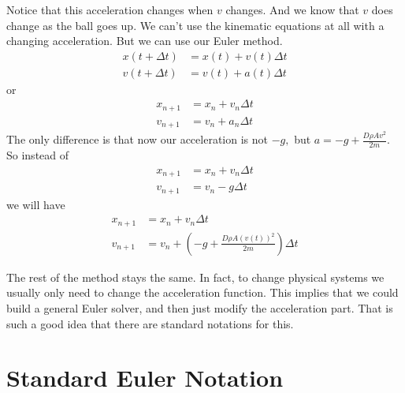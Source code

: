\documentclass[twoside,11pt,ShortChapTitles]{BYUTextbook}
\begin{document}
Notice that this acceleration changes when $v$ changes. And we know that $v$
does change as the ball goes up. We can't use the kinematic equations at all
with a changing acceleration. But we can use our Euler method. \begin{align*}
x(t+\Delta t)  & =x(t)+v(t)\Delta t\\
v(t+\Delta t)  & =v(t)+a\left(  t\right)  \Delta t
\end{align*}
or \begin{align*}
x_{n+1}  & =x_{n}+v_{n}\Delta t\\
v_{n+1}  & =v_{n}+a_{n}\Delta t
\end{align*}
The only difference is that now our acceleration is not $-g,$ but
$a=-g+\frac{D\rho Av^{2}}{2m}.$ So instead of
\begin{align*}
x_{n+1}  & =x_{n}+v_{n}\Delta t\\
v_{n+1}  & =v_{n}-g\Delta t
\end{align*}
we will have \begin{align*}
x_{n+1}  & =x_{n}+v_{n}\Delta t\\
v_{n+1}  & =v_{n}+\left(  -g+\frac{D\rho A\left(  v(t)\right)  ^{2}} {2m}\right)  \Delta t
\end{align*}


The rest of the method stays the same. In fact, to change physical systems we
usually only need to change the acceleration function. This implies that we
could build a general Euler solver, and then just modify the acceleration
part. That is such a good idea that there are standard notations for this.

\section{Standard Euler Notation}
\end{document}
